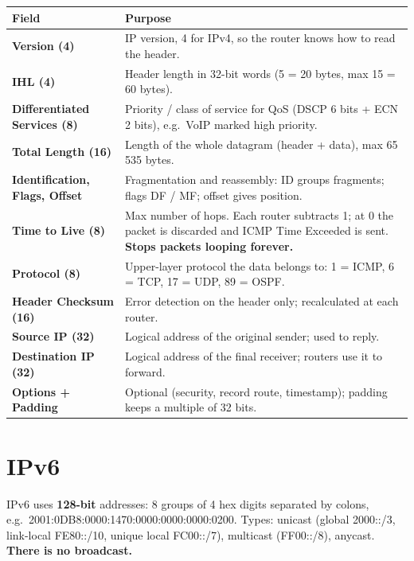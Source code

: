 \documentclass[10pt]{article}
\begin{document}
\begin{ans}
\small
\begin{tabularx}{\linewidth}{@{}>{\bfseries}lX@{}}
\toprule
Field & Purpose\\\midrule
Version (4) & IP version, 4 for IPv4, so the router knows how to read the header.\\
IHL (4) & Header length in 32-bit words (5 = 20 bytes, max 15 = 60 bytes).\\
Differentiated Services (8) & Priority / class of service for QoS (DSCP 6 bits + ECN 2 bits), e.g.\ VoIP marked high priority.\\
Total Length (16) & Length of the whole datagram (header + data), max 65\,535 bytes.\\
Identification, Flags, Offset & Fragmentation and reassembly: ID groups fragments; flags DF / MF; offset gives position.\\
Time to Live (8) & Max number of hops. Each router subtracts 1; at 0 the packet is discarded and ICMP Time Exceeded is sent. \textbf{Stops packets looping forever.}\\
Protocol (8) & Upper-layer protocol the data belongs to: 1 = ICMP, 6 = TCP, 17 = UDP, 89 = OSPF.\\
Header Checksum (16) & Error detection on the header only; recalculated at each router.\\
Source IP (32) & Logical address of the original sender; used to reply.\\
Destination IP (32) & Logical address of the final receiver; routers use it to forward.\\
Options + Padding & Optional (security, record route, timestamp); padding keeps a multiple of 32 bits.\\
\bottomrule
\end{tabularx}
\end{ans}

\section{IPv6}

IPv6 uses \textbf{128-bit} addresses: 8 groups of 4 hex digits separated by colons, e.g.\ 2001:0DB8:0000:1470:0000:0000:0000:0200.
Types: unicast (global 2000::/3, link-local FE80::/10, unique local FC00::/7), multicast (FF00::/8), anycast. \textbf{There is no broadcast.}
\end{document}
